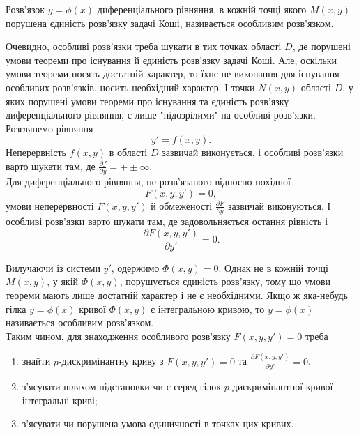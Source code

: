 \begin{definition}
	Розв’язок $y = \phi(x)$ диференціального рівняння, в кожній точці якого $M(x,y)$ порушена єдиність розв’язку задачі Коші, називається особливим розв’язком. 
\end{definition}

Очевидно, особливі розв’язки треба шукати в тих точках області $D$, де порушені умови теореми про існування й єдиність розв’язку задачі Коші. Але, оскільки умови теореми носять достатній характер, то їхнє не виконання для існування особливих розв’язків, носить необхідний характер. І точки $N(x,y)$ області $D$, у яких порушені умови теореми про існування та єдиність розв’язку диференціального рівняння, є лише "підозрілими" на особливі розв’язки. \\

Розглянемо рівняння 
\begin{equation*}
	y' = f(x,y).
\end{equation*}
Неперервність $f(x,y)$ в області $D$ зазвичай виконується, і особливі роз\-в'яз\-ки варто шукати там, де $\frac{\partial f}{\partial y} = +\pm \infty$. \\

Для диференціального рівняння, не роз\-в'яз\-а\-но\-го відносно похідної 
\begin{equation*}
	F(x, y, y') = 0,
\end{equation*}
умови неперервності $F(x,y,y')$ й обмеженості $\frac{\partial F}{\partial y}$ зазвичай виконуються. І особливі розв’язки варто шукати там, де задовольняється остання рівність і 
\begin{equation*}
	\frac{\partial F(x,y,y')}{\partial y'} = 0.
\end{equation*}

Вилучаючи із системи $y'$, одержимо $\Phi(x,y)=0$. Однак не в кожній точці $M(x,y)$, у якій $\Phi(x,y)$, порушується єдиність роз\-в'яз\-ку, тому що умови теореми мають лише достатній характер і не є необхідними. Якщо ж яка-небудь гілка $y=\phi(x)$ кривої $\Phi(x,y)$ є інтегральною кривою, то $y=\phi(x)$ називається особливим роз\-в'яз\-ком. \\

Таким чином, для знаходження особливого роз\-в'яз\-ку $F(x, y, y') = 0$ треба
\begin{enumerate}
	\item знайти $p$-дискримінантну криву з $F(x, y, y') = 0$ та $\frac{\partial F(x,y,y')}{\partial y'} = 0$.
	\item з'я\-су\-ва\-ти шляхом підстановки чи є серед гілок $p$-дискримінантної кривої інтегральні криві;
	\item з'я\-су\-ва\-ти чи порушена умова одиничності в точках цих кривих.
\end{enumerate}
